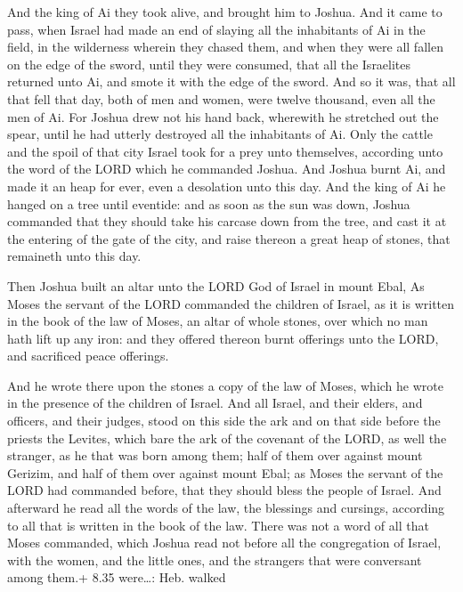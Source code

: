 And the king of Ai they took alive, and brought him to
Joshua.  And it came to pass, when Israel had made an end
of slaying all the inhabitants of Ai in the field, in the wilderness
wherein they chased them, and when they were all fallen on the edge of
the sword, until they were consumed, that all the Israelites returned
unto Ai, and smote it with the edge of the sword.  And so
it was, that all that fell that day, both of men and women, were twelve
thousand, even all the men of Ai.  For Joshua drew not his
hand back, wherewith he stretched out the spear, until he had utterly
destroyed all the inhabitants of Ai.  Only the cattle and
the spoil of that city Israel took for a prey unto themselves, according
unto the word of the LORD which he commanded Joshua.  And
Joshua burnt Ai, and made it an heap for ever, even a desolation unto
this day.  And the king of Ai he hanged on a tree until
eventide: and as soon as the sun was down, Joshua commanded that they
should take his carcase down from the tree, and cast it at the entering
of the gate of the city, and raise thereon a great heap of stones, that
remaineth unto this day.

 Then Joshua built an altar unto the LORD God of Israel
in mount Ebal,  As Moses the servant of the LORD commanded
the children of Israel, as it is written in the book of the law of
Moses, an altar of whole stones, over which no man hath lift up any
iron: and they offered thereon burnt offerings unto the LORD, and
sacrificed peace offerings.

 And he wrote there upon the stones a copy of the law of
Moses, which he wrote in the presence of the children of Israel.
 And all Israel, and their elders, and officers, and their
judges, stood on this side the ark and on that side before the priests
the Levites, which bare the ark of the covenant of the LORD, as well the
stranger, as he that was born among them; half of them over against
mount Gerizim, and half of them over against mount Ebal; as Moses the
servant of the LORD had commanded before, that they should bless the
people of Israel.  And afterward he read all the words of
the law, the blessings and cursings, according to all that is written in
the book of the law.  There was not a word of all that
Moses commanded, which Joshua read not before all the congregation of
Israel, with the women, and the little ones, and the strangers that were
conversant among them.+ 8.35 were\ldots: Heb. walked

